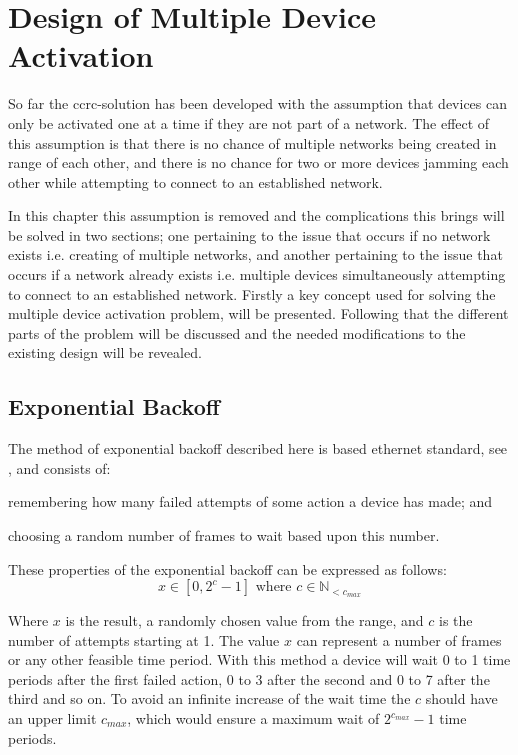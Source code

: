 \chapter{Design of Multiple Device Activation}\label{chap:MDA-CCRC}
So far the \gls{ccrc}-solution has been developed with the assumption that devices can only be activated one at a time if they are not part of a network.
The effect of this assumption is that there is no chance of multiple networks being created in range of each other, and there is no chance for two or more devices jamming each other while attempting to connect to an established network.

In this chapter this assumption is removed and the complications this brings will be solved in two sections; one pertaining to the issue that occurs if no network exists i.e. creating of multiple networks, and another pertaining to the issue that occurs if a network already exists i.e. multiple devices simultaneously attempting to connect to an established network.
Firstly a key concept used for solving the multiple device activation problem, will be presented.
Following that the different parts of the problem will be discussed and the needed modifications to the existing design will be revealed.

\section{Exponential Backoff} %
\label{sec:exponential_backoff}
The method of exponential backoff described here is based ethernet standard, see \citep{Ebackoff}, and consists of:
\begin{enumerate*}[label=\itshape \alph*\upshape)]
    \item remembering how many failed attempts of some action a device has made; and
    \item choosing a random number of frames to wait based upon this number.   
\end{enumerate*}
These properties of the exponential backoff can be expressed as follows:
\begin{equation}
     x \in [0, 2^c - 1] \text{ where } c \in \mathbb{N}_{<c_{max}}
\end{equation}

Where $x$ is the result, a randomly chosen value from the range, and $c$ is the number of attempts starting at 1. 
The value $x$ can represent a number of frames or any other feasible time period.
With this method a device will wait 0 to 1 time periods after the first failed action, 0 to 3 after the second and 0 to 7 after the third and so on. 
To avoid an infinite increase of the wait time the $c$ should have an upper limit $c_{max}$, which would ensure a maximum wait of $2^{c_{max}}-1$ time periods.

